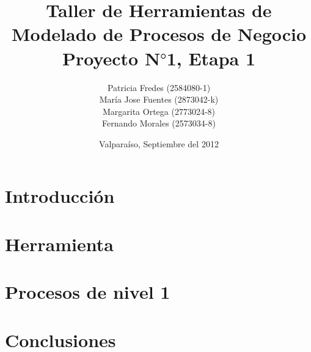 \documentclass[10pt,letterpaper]{article}
\title{Taller de Herramientas de Modelado de Procesos de Negocio \\ Proyecto N$°$1, Etapa 1}
\author{Patricia Fredes (2584080-1) \\ María Jose Fuentes (2873042-k) \\ Margarita Ortega (2773024-8) \\ Fernando Morales (2573034-8)}
\date{\vspace*{1cm} Valparaí­so, Septiembre del 2012}
\begin{document}
\maketitle
\thispagestyle{empty}
\newpage
\tableofcontents

\makeatother

\newpage

\section{Introducción}


\section{Herramienta}


\section{Procesos de nivel 1}


\section{Conclusiones}




 
\end{document}

